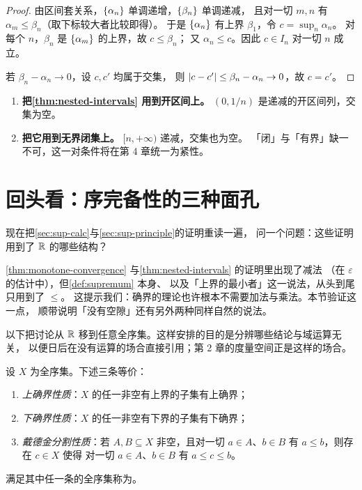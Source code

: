 \begin{proof}
  由区间套关系，\(\{\alpha_{n}\}\) 单调递增，\(\{\beta_{n}\}\) 单调递减，
  且对一切 \(m, n\) 有 \(\alpha_{m} \le \beta_{n}\)（取下标较大者比较即得）。
  于是 \(\{\alpha_{n}\}\) 有上界 \(\beta_{1}\)，令 \(c = \sup_{n} \alpha_{n}\)。
  对每个 \(n\)，\(\beta_{n}\) 是 \(\{\alpha_{m}\}\) 的上界，故 \(c \le \beta_{n}\)；
  又 \(\alpha_{n} \le c\)。因此 \(c \in I_{n}\) 对一切 \(n\) 成立。

  若 \(\beta_{n} - \alpha_{n} \to 0\)，设 \(c, c'\) 均属于交集，
  则 \(\lvert c - c'\rvert \le \beta_{n} - \alpha_{n} \to 0\)，故 \(c = c'\)。
\end{proof}

\begin{pitfall}
  \begin{enumerate}[label=(\arabic*), leftmargin=1.6em]
    \item \textbf{把\cref{thm:nested-intervals} 用到开区间上。}
          \((0, 1/n)\) 是递减的开区间列，交集为空。
    \item \textbf{把它用到无界闭集上。} \([n, +\infty)\) 递减，交集也为空。
          「闭」与「有界」缺一不可，这一对条件将在第 4 章统一为紧性。
  \end{enumerate}
\end{pitfall}

\section{回头看：序完备性的三种面孔}
\label{sec:order-complete}

现在把\cref{sec:sup-calc}与\cref{sec:sup-principle}的证明重读一遍，
问一个问题：这些证明用到了 \(\mathbb{R}\) 的哪些结构？

\cref{thm:monotone-convergence} 与\cref{thm:nested-intervals} 的证明里出现了减法
（在 \(\varepsilon\) 的估计中），但\cref{def:supremum} 本身、
以及「上界的最小者」这一说法，从头到尾只用到了 \(\le\)。
这提示我们：确界的理论也许根本不需要加法与乘法。本节验证这一点，
顺带说明「没有空隙」还有另外两种同样自然的说法。

以下把讨论从 \(\mathbb{R}\) 移到任意全序集。这样安排的目的是分辨哪些结论与域运算无关，
以便日后在没有运算的场合直接引用；第 2 章的度量空间正是这样的场合。

\begin{theorem}[序完备性的三种等价刻画]
  \label{thm:order-complete-equiv}
  设 \(X\) 为全序集。下述三条等价：
  \begin{enumerate}[label=(\roman*)]
    \item \emph{上确界性质}：\(X\) 的任一非空有上界的子集有上确界；
    \item \emph{下确界性质}：\(X\) 的任一非空有下界的子集有下确界；
    \item \emph{戴德金分割性质}：若 \(A, B \subseteq X\) 非空，且对一切
          \(a \in A\)、\(b \in B\) 有 \(a \le b\)，则存在 \(c \in X\) 使得
          对一切 \(a \in A\)、\(b \in B\) 有 \(a \le c \le b\)。
  \end{enumerate}
  满足其中任一条的全序集称为。
\end{theorem}

